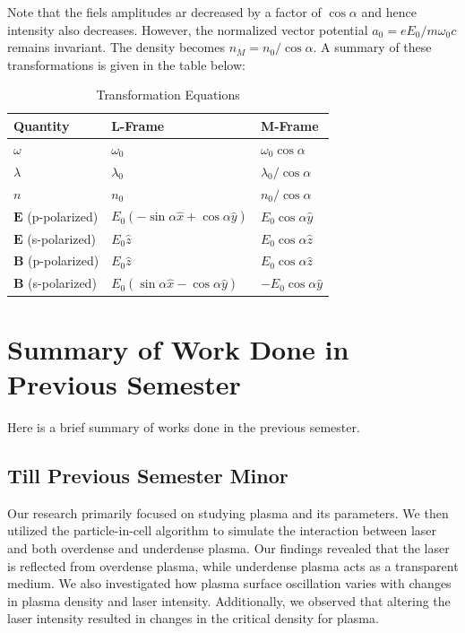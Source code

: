 \documentclass[12pt]{article}
\begin{document}
Note that the fiels amplitudes ar decreased by a factor of $\cos\alpha$ and hence intensity also decreases. However, the normalized vector potential $a_0 = eE_0/m\omega_0c$ remains invariant. The density becomes $n_M = n_0/\cos\alpha$. A summary of these transformations is given in the table below:
\begin{table}[!ht]
    \centering
    \caption{Transformation Equations}
    \label{tab:transformation}
    \vspace{0.3cm}
    \begin{tabular}{|l|l|l|}
        \hline
        \textbf{Quantity}          & \textbf{L-Frame}                                 & \textbf{M-Frame}          \\ \hline
        $\omega$                   & $\omega_0$                                       & $\omega_0 \cos\alpha$     \\ \hline
        $\lambda$                  & $\lambda_0$                                      & $\lambda_0/\cos\alpha$    \\ \hline
        $n$                        & $n_0$                                            & $n_0/\cos\alpha$          \\ \hline
        $\mathbf{E}$ (p-polarized) & $E_0 (-\sin\alpha \hat{x} + \cos\alpha \hat{y})$ & $E_0 \cos\alpha \hat{y}$  \\ \hline
        $\mathbf{E}$ (s-polarized) & $E_0 \hat{z}$                                    & $E_0 \cos\alpha \hat{z}$  \\ \hline
        $\mathbf{B}$ (p-polarized) & $E_0 \hat{z}$                                    & $E_0 \cos\alpha \hat{z}$  \\ \hline
        $\mathbf{B}$ (s-polarized) & $E_0 (\sin\alpha \hat{x} - \cos\alpha \hat{y})$  & $-E_0 \cos\alpha \hat{y}$ \\ \hline
    \end{tabular}
\end{table}

\section{Summary of Work Done in Previous Semester}
Here is a brief summary of works done in the previous semester.

\subsection{Till Previous Semester Minor}
Our research primarily focused on studying plasma and its parameters. We then utilized the particle-in-cell algorithm to simulate the interaction between laser and both overdense and underdense plasma. Our findings revealed that the laser is reflected from overdense plasma, while underdense plasma acts as a transparent medium. We also investigated how plasma surface oscillation varies with changes in plasma density and laser intensity. Additionally, we observed that altering the laser intensity resulted in changes in the critical density for plasma.
\end{document}
